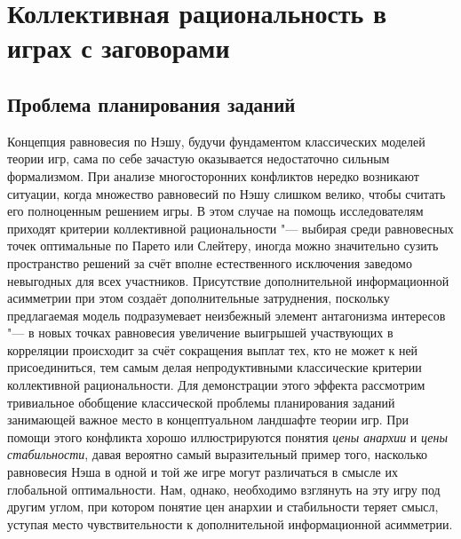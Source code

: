\chapter{Коллективная рациональность в играх с заговорами}\label{ch:ch2}

\section{Проблема планирования заданий}\label{sec:ch2/sec1}

Концепция равновесия по Нэшу, будучи фундаментом классических моделей теории игр, сама по себе зачастую оказывается недостаточно сильным формализмом. При анализе многосторонних конфликтов нередко возникают ситуации, когда множество равновесий по Нэшу слишком велико, чтобы считать его полноценным решением игры. В этом случае на помощь исследователям приходят критерии коллективной рациональности "--- выбирая среди равновесных точек оптимальные по Парето или Слейтеру, иногда можно значительно сузить пространство решений за счёт вполне естественного исключения заведомо невыгодных для всех участников. Присутствие дополнительной информационной асимметрии при этом создаёт дополнительные затруднения, поскольку предлагаемая модель подразумевает неизбежный элемент антагонизма интересов "--- в новых точках равновесия увеличение выигрышей участвующих в корреляции происходит за счёт сокращения выплат тех, кто не может к ней присоединиться, тем самым делая непродуктивными классические критерии коллективной рациональности. Для демонстрации этого эффекта рассмотрим тривиальное обобщение классической проблемы планирования заданий \cite{Koutsoupias} занимающей важное место в концептуальном ландшафте теории игр. При помощи этого конфликта хорошо иллюстрируются понятия \emph{цены анархии} и \emph{цены стабильности}, давая вероятно самый выразительный пример того, насколько равновесия Нэша в одной и той же игре могут различаться в смысле их глобальной оптимальности. Нам, однако, необходимо взглянуть на эту игру под другим углом, при котором понятие цен анархии и стабильности теряет смысл, уступая место чувствительности к дополнительной информационной асимметрии.

